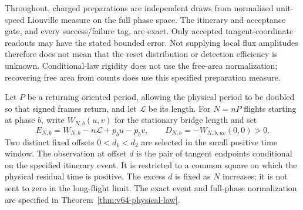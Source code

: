 Throughout, charged preparations are independent draws from normalized
unit-speed Liouville measure on the full phase space.  The itinerary
and acceptance gate, and every success/failure tag, are exact.  Only
accepted tangent-coordinate readouts may have the stated bounded error.
Not supplying local flux amplitudes therefore does not mean that the
reset distribution or detection efficiency is unknown.  Conditional-law
rigidity does not use the free-area normalization; recovering free area
from counts does use this specified preparation measure.

Let $P$ be a returning oriented period, allowing the physical period to
be doubled so that signed frames return, and let $\mathcal L$ be its
length.  For $N=nP$ flights starting at phase $b$, write $W_{N,b}(u,v)$
for the stationary bridge length and set
\[
 E_{N,b}=W_{N,b}-n\mathcal L+p_bu-p_bv,
 \qquad D_{N,b}=-W_{N,b,uv}(0,0)>0.
\]
Two distinct fixed offsets $0<d_1<d_2$ are selected in the small positive
time window.  The observation at offset $d$ is the pair of tangent
endpoints conditional on the specified itinerary event.  It is restricted
to a common square on which the physical residual time is positive.
The excess $d$ is fixed as $N$ increases; it is not sent to zero in the
long-flight limit.  The exact event and full-phase normalization are
specified in Theorem~\ref{thm:v64-physical-law}.

